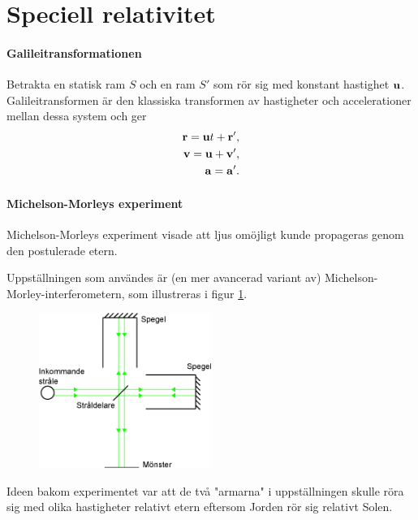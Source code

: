 \section{Speciell relativitet}

\paragraph{Galileitransformationen}
Betrakta en statisk ram $S$ och en ram $S'$ som rör sig med konstant hastighet $\vb{u}$. Galileitransformen är den klassiska transformen av hastigheter och accelerationer mellan dessa system och ger
\begin{align*}
	\vb{r} = \vb{u}t + \vb{r}', \\
	\vb{v} = \vb{u} + \vb{v}', \\
	\vb{a} = \vb{a}'. \\
\end{align*}

\paragraph{Michelson-Morleys experiment}
Michelson-Morleys experiment visade att ljus omöjligt kunde propageras genom den postulerade etern.

Uppställningen som användes är (en mer avancerad variant av) Michelson-Morley-interferometern, som illustreras i figur \ref{fig:interferometer}.
\begin{figure}[!ht]
	\centering
	\includegraphics[width = 0.5\textwidth]{./Images/interferometer.eps}
	\caption{}
	\label{fig:interferometer}
\end{figure}

Ideen bakom experimentet var att de två "armarna" i uppställningen skulle röra sig med olika hastigheter relativt etern eftersom Jorden rör sig relativt Solen.

